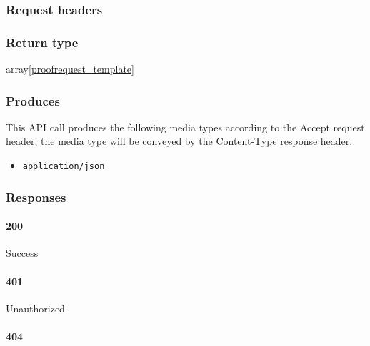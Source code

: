 \hypertarget{request-headers-94}{%
\subsubsection{Request headers}\label{request-headers-94}}

\hypertarget{return-type-132}{%
\subsubsection{Return type}\label{return-type-132}}

array{[}\protect\hyperlink{proofrequest_template}{proofrequest\_template}{]}

\hypertarget{produces-168}{%
\subsubsection{Produces}\label{produces-168}}

This API call produces the following media types according to the
{Accept} request header; the media type will be conveyed by the
{Content-Type} response header.

\begin{itemize}
\tightlist
\item
  \texttt{application/json}
\end{itemize}

\hypertarget{responses-173}{%
\subsubsection{Responses}\label{responses-173}}

\hypertarget{section-558}{%
\paragraph{200}\label{section-558}}

Success

\hypertarget{section-559}{%
\paragraph{401}\label{section-559}}

Unauthorized \protect\hyperlink{}{}

\hypertarget{section-560}{%
\paragraph{404}\label{section-560}}

